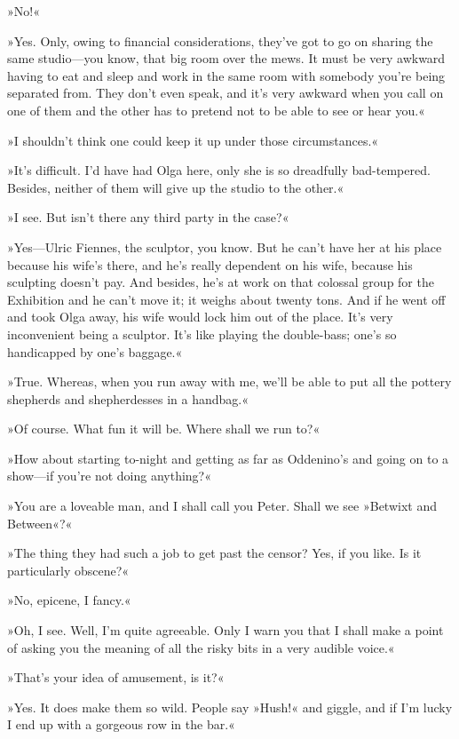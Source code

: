 »No!«

»Yes. Only, owing to financial considerations, they've got to go on sharing the same studio—you know, that big room over the mews. It must be very awkward having to eat and sleep and work in the same room with somebody you're being separated from. They don't even speak, and it's very awkward when you call on one of them and the other has to pretend not to be able to see or hear you.«

»I shouldn't think one could keep it up under those circumstances.«

»It's difficult. I'd have had Olga here, only she is so dreadfully bad-tempered. Besides, neither of them will give up the studio to the other.«

»I see. But isn't there any third party in the case?«

»Yes—Ulric Fiennes, the sculptor, you know. But he can't have her at his place because his wife's there, and he's really dependent on his wife, because his sculpting doesn't pay. And besides, he's at work on that colossal group for the Exhibition and he can't move it; it weighs about twenty tons. And if he went off and took Olga away, his wife would lock him out of the place. It's very inconvenient being a sculptor. It's like playing the double-bass; one's so handicapped by one's baggage.«

»True. Whereas, when you run away with me, we'll be able to put all the pottery shepherds and shepherdesses in a handbag.«

»Of course. What fun it will be. Where shall we run to?«

»How about starting to-night and getting as far as Oddenino's and going on to a show—if you're not doing anything?«

»You are a loveable man, and I shall call you Peter. Shall we see »Betwixt and Between«?«

»The thing they had such a job to get past the censor? Yes, if you like. Is it particularly obscene?«

»No, epicene, I fancy.«

»Oh, I see. Well, I'm quite agreeable. Only I warn you that I shall make a point of asking you the meaning of all the risky bits in a very audible voice.«

»That's your idea of amusement, is it?«

»Yes. It does make them so wild. People say »Hush!« and giggle, and if I'm lucky I end up with a gorgeous row in the bar.«

